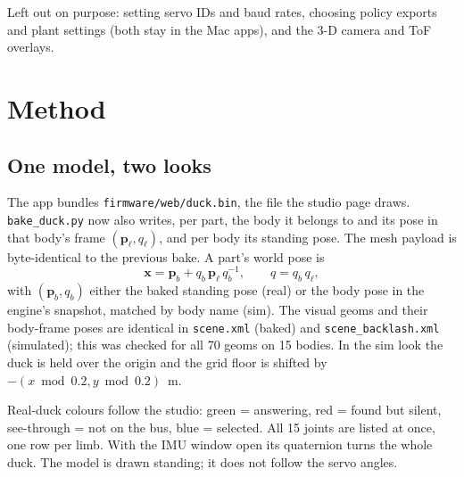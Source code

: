 \documentclass[11pt]{article}
\begin{document}
Left out on purpose: setting servo IDs and baud rates, choosing policy exports and plant settings (both stay in the
Mac apps), and the 3-D camera and ToF overlays.

\section{Method}
\subsection{One model, two looks}
The app bundles \texttt{firmware/web/duck.bin}, the file the studio page draws. \texttt{bake\_duck.py} now also
writes, per part, the body it belongs to and its pose in that body's frame $(\mathbf{p}_\ell, q_\ell)$, and per body
its standing pose. The mesh payload is byte-identical to the previous bake. A part's world pose is
\begin{equation}
\mathbf{x} = \mathbf{p}_b + q_b\,\mathbf{p}_\ell\,q_b^{-1}, \qquad q = q_b\,q_\ell ,
\end{equation}
with $(\mathbf{p}_b, q_b)$ either the baked standing pose (real) or the body pose in the engine's snapshot, matched
by body name (sim). The visual geoms and their body-frame poses are identical in \texttt{scene.xml} (baked) and
\texttt{scene\_backlash.xml} (simulated); this was checked for all 70 geoms on 15 bodies. In the sim look the duck
is held over the origin and the grid floor is shifted by $-(x \bmod 0.2, y \bmod 0.2)$~m.

Real-duck colours follow the studio: green = answering, red = found but silent, see-through = not on the bus,
blue = selected. All 15 joints are listed at once, one row per limb. With the IMU window open its quaternion turns
the whole duck. The model is drawn standing; it does not follow the servo angles.
\end{document}
